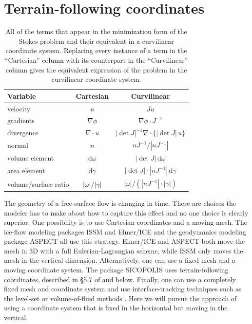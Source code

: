 \documentclass[gmd, manuscript]{copernicus}
\begin{document}
\section{Terrain-following coordinates}

\begin{table}[t]
    \caption{All of the terms that appear in the minimization form of the Stokes problem and their equivalent in a curvilinear coordinate system.
    Replacing every instance of a term in the ``Cartesian'' column with its counterpart in the  ``Curvilinear'' column gives the equivalent expression of the problem in the curvilinear coordinate system.}
    \label{tab:xform-rules}
    \centering
    \begin{tabular}{lcc}
        \hline
        Variable & Cartesian & Curvilinear \\
        \hline
        velocity & $u$ & $Ju$ \\
        gradients & $\nabla \phi$ & $\nabla\phi\cdot J^{-1}$ \\
        divergence & $\nabla\cdot u$ & $|\det J|^{-1}\nabla\cdot\{|\det J|\,u\}$ \\
        normal & $n$ & $nJ^{-1}/|nJ^{-1}|$ \\
        volume element & $\mathrm d\omega$ & $|\det J|\,\mathrm d\omega$ \\
        area element & $\mathrm d\gamma$ & $|\det J|\cdot |nJ^{-1}|\,\mathrm d\gamma$ \\
        volume/surface ratio & $|\omega|/|\gamma|$ & $|\omega|/(|nJ^{-1}|\cdot|\gamma|)$ \\
        \hline
    \end{tabular}
\end{table}

The geometry of a free-surface flow is changing in time.
There are choices the modeler has to make about how to capture this effect and no one choice is clearly superior.
One possibility is to use Cartesian coordinates and a moving mesh.
The ice-flow modeling packages ISSM \citep{larour2012continental} and Elmer/ICE \citep{gagliardini2013capabilities} and the geodynamics modeling package ASPECT \citep{rose2017stability} all use this strategy.
Elmer/ICE and ASPECT both move the mesh in 3D with a full Eulerian-Lagrangian scheme, while ISSM only moves the mesh in the vertical dimension.
Alternatively, one can use a fixed mesh and a moving coordinate system.
The package SICOPOLIS uses terrain-following coordinates, described in \S5.7 of \citet{greve2009dynamics} and below.
Finally, one can use a completely fixed mesh and coordinate system and use interface-tracking techniques such as the level-set or volume-of-fluid methods \citep{hossain2020modelling, gray2026variational}.
Here we will pursue the approach of using a coordinate system that is fixed in the horizontal but moving in the vertical.
\end{document}
